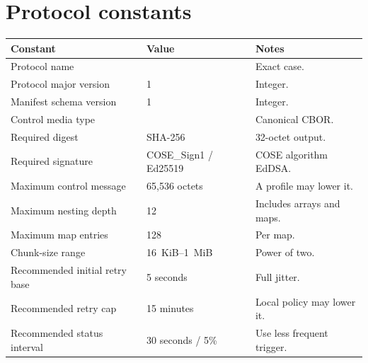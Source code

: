 \section{Protocol constants}

\begin{longtable}{@{}L{59mm}L{35mm}L{58mm}@{}}
  \toprule
  \textbf{Constant} & \textbf{Value} & \textbf{Notes} \\
  \midrule
  Protocol name &  & Exact case. \\
  Protocol major version & 1 & Integer. \\
  Manifest schema version & 1 & Integer. \\
  Control media type &  & Canonical CBOR. \\
  Required digest & SHA-256 & 32-octet output. \\
  Required signature & COSE\_Sign1 / Ed25519 & COSE algorithm EdDSA. \\
  Maximum control message & 65,536 octets & A profile may lower it. \\
  Maximum nesting depth & 12 & Includes arrays and maps. \\
  Maximum map entries & 128 & Per map. \\
  Chunk-size range & 16~KiB--1~MiB & Power of two. \\
  Recommended initial retry base & 5 seconds & Full jitter. \\
  Recommended retry cap & 15 minutes & Local policy may lower it. \\
  Recommended status interval & 30 seconds / 5\% & Use less frequent trigger. \\
  \bottomrule
\end{longtable}
